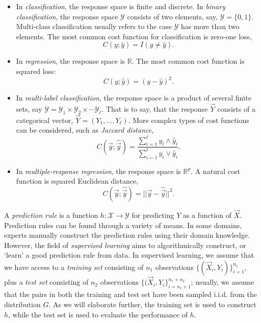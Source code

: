 \begin{itemize}
\item In \emph{classification}, the response space is finite and
  discrete.  In \emph{binary classification}, the response space
  $\mathcal{Y}$ consists of two elements, say, $\mathcal{Y} = \{0,
  1\}$.  Multi-class classification usually refers to the case
  $\mathcal{Y}$ has more than two elements.  The most common cost
  function for classification is zero-one loss,
\[
C(y; \hat{y}) = I(y \neq \hat{y}).
\]
\item In \emph{regression}, the response space is $\mathbb{R}$.  The most common cost function is squared loss:
\[
C(y; \hat{y}) = (y - \hat{y})^2.
\]
\item In \emph{multi-label classification}, the response space is a
  product of several finite sets, say $\mathcal{Y} = \mathcal{Y}_1
  \times \mathcal{Y}_2 \times \cdots \mathcal{Y}_\ell$.  That is to
  say, that the response $\vec{Y}$ consists of a categorical vector,
  $\vec{Y} = (Y_1,\hdots, Y_\ell)$. More complex types of cost
  functions can be considered, such as \emph{Jaccard distance},
\[
C(\vec{y}; \hat{\vec{y}}) = \frac{\sum_{i=1}^\ell y_i \wedge \hat{y}_i}{\sum_{i=1}^\ell y_i \vee \hat{y}_i}.
\]
\item In \emph{multiple-response regression}, the response space is $\mathbb{R}^p$.  A natural cost function is squared Euclidean distance,
\[
C(\vec{y}; \hat{\vec{y}}) = ||\vec{y} - \hat{\vec{y}}||^2.
\]
\end{itemize}

A \emph{prediction rule} is a function $h: \mathcal{X} \to
\mathcal{Y}$ for predicting $Y$ as a function of $\vec{X}$.
Prediction rules can be found through a variety of means.  In some
domains, experts manually construct the prediction rules using their
domain knowledge.  However, the field of \emph{supervised learning}
aims to algorithmically construct, or `learn' a good prediction rule
from data.  In supervised learning, we assume that we have access to a
\emph{training set} consisting of $n_1$ observations
$\{(\vec{X}_i,Y_i)\}_{i=1}^{n_1}$, plus a \emph{test set} consisting
of $n_2$ observations $\{(\vec{X}_i,Y_i\}_{i=n_1 + 1}^{n_1 + n_2}$;
usually, we assume that the pairs in both the training and test set
have been sampled i.i.d. from the distribution $G$.  As we will
elaborate further, the training set is used to construct $h$, while
the test set is used to evaluate the performance of $h$.

